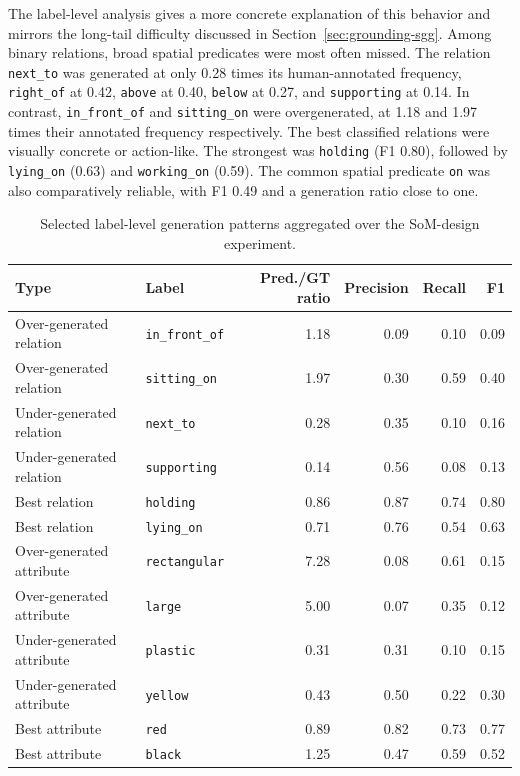 The label-level analysis gives a more concrete explanation of this behavior and mirrors the long-tail difficulty discussed in Section~\ref{sec:grounding-sgg}. Among binary relations, broad spatial predicates were most often missed. The relation \texttt{next\_to} was generated at only 0.28 times its human-annotated frequency, \texttt{right\_of} at 0.42, \texttt{above} at 0.40, \texttt{below} at 0.27, and \texttt{supporting} at 0.14. In contrast, \texttt{in\_front\_of} and \texttt{sitting\_on} were overgenerated, at 1.18 and 1.97 times their annotated frequency respectively. The best classified relations were visually concrete or action-like. The strongest was \texttt{holding} (F1 0.80), followed by \texttt{lying\_on} (0.63) and \texttt{working\_on} (0.59). The common spatial predicate \texttt{on} was also comparatively reliable, with F1 0.49 and a generation ratio close to one.

\begin{table}[!htbp]
\centering
\scriptsize
\caption{Selected label-level generation patterns aggregated over the SoM-design experiment.}\label{tab:label-generation-patterns}
\begin{tabular}{llrrrr}
\toprule
Type & Label & Pred./GT ratio & Precision & Recall & F1 \\
\midrule
Over-generated relation & \texttt{in\_front\_of} & 1.18 & 0.09 & 0.10 & 0.09 \\
Over-generated relation & \texttt{sitting\_on} & 1.97 & 0.30 & 0.59 & 0.40 \\
Under-generated relation & \texttt{next\_to} & 0.28 & 0.35 & 0.10 & 0.16 \\
Under-generated relation & \texttt{supporting} & 0.14 & 0.56 & 0.08 & 0.13 \\
Best relation & \texttt{holding} & 0.86 & 0.87 & 0.74 & 0.80 \\
Best relation & \texttt{lying\_on} & 0.71 & 0.76 & 0.54 & 0.63 \\
\midrule
Over-generated attribute & \texttt{rectangular} & 7.28 & 0.08 & 0.61 & 0.15 \\
Over-generated attribute & \texttt{large} & 5.00 & 0.07 & 0.35 & 0.12 \\
Under-generated attribute & \texttt{plastic} & 0.31 & 0.31 & 0.10 & 0.15 \\
Under-generated attribute & \texttt{yellow} & 0.43 & 0.50 & 0.22 & 0.30 \\
Best attribute & \texttt{red} & 0.89 & 0.82 & 0.73 & 0.77 \\
Best attribute & \texttt{black} & 1.25 & 0.47 & 0.59 & 0.52 \\
\bottomrule
\end{tabular}
\end{table}

